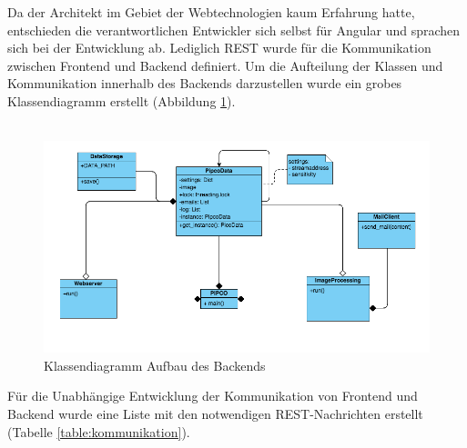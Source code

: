 Da der Architekt im Gebiet der Webtechnologien kaum Erfahrung hatte, entschieden die verantwortlichen Entwickler sich selbst für Angular und sprachen sich bei
der Entwicklung ab. Lediglich REST wurde für die Kommunikation zwischen Frontend und Backend definiert. 
Um die Aufteilung der Klassen und Kommunikation innerhalb des Backends darzustellen wurde ein grobes Klassendiagramm erstellt (Abbildung \ref{img:backend-classdiagramm}).\\\\
\begin{figure}[]
	\centering
	\includegraphics[width=\textwidth]{content/pictures/classdiagramm.png}
	\caption{Klassendiagramm Aufbau des Backends}
	\label{img:backend-classdiagramm}
\end{figure}
Für die Unabhängige Entwicklung der Kommunikation von Frontend und Backend wurde eine Liste mit den notwendigen REST-Nachrichten erstellt (Tabelle \ref{table:kommunikation}).\\\\
